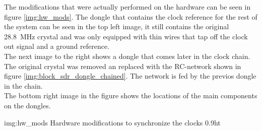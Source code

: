 The modifications that were actually performed on the
hardware can be seen in figure \ref{img:hw_mods}.
The dongle that contains the clock reference for
the rest of the system can be seen in the top left
image, it still contains the original
\SI{28.8}{\mega\hertz} crystal and was only equipped
with thin wires that tap off the clock out signal
and a ground reference. \\

The next image to the right shows a dongle
that comes later in the clock chain.
The original crystal was removed an replaced with
the RC-network shown in figure \ref{img:block_sdr_dongle_chained}.
The network is fed by the previos dongle in the chain. \\

The bottom right image in the figure shows the
locations of the main components on the dongles.

             {img:hw_mods}
             {Hardware modifications to synchronize the clocks}
             {0.9}{ht}
